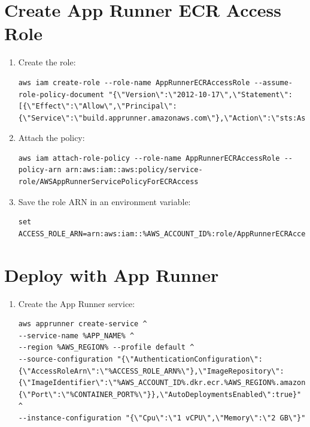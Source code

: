 \section{Create App Runner ECR Access Role}
\begin{enumerate}
  \item Create the role:
\begin{verbatim}
aws iam create-role --role-name AppRunnerECRAccessRole --assume-role-policy-document "{\"Version\":\"2012-10-17\",\"Statement\":[{\"Effect\":\"Allow\",\"Principal\":{\"Service\":\"build.apprunner.amazonaws.com\"},\"Action\":\"sts:AssumeRole\"}]}"
\end{verbatim}

  \item Attach the policy:
\begin{verbatim}
aws iam attach-role-policy --role-name AppRunnerECRAccessRole --policy-arn arn:aws:iam::aws:policy/service-role/AWSAppRunnerServicePolicyForECRAccess
\end{verbatim}

  \item Save the role ARN in an environment variable:
\begin{verbatim}
set ACCESS_ROLE_ARN=arn:aws:iam::%AWS_ACCOUNT_ID%:role/AppRunnerECRAccessRole
\end{verbatim}
\end{enumerate}

\section{Deploy with App Runner}
\begin{enumerate}
  \item Create the App Runner service:
\begin{verbatim}
aws apprunner create-service ^
--service-name %APP_NAME% ^
--region %AWS_REGION% --profile default ^
--source-configuration "{\"AuthenticationConfiguration\":{\"AccessRoleArn\":\"%ACCESS_ROLE_ARN%\"},\"ImageRepository\":{\"ImageIdentifier\":\"%AWS_ACCOUNT_ID%.dkr.ecr.%AWS_REGION%.amazonaws.com/%ECR_REPO%:%IMAGE_TAG%\",\"ImageRepositoryType\":\"ECR\",\"ImageConfiguration\":{\"Port\":\"%CONTAINER_PORT%\"}},\"AutoDeploymentsEnabled\":true}" ^
--instance-configuration "{\"Cpu\":\"1 vCPU\",\"Memory\":\"2 GB\"}"
\end{verbatim}
\end{enumerate}


